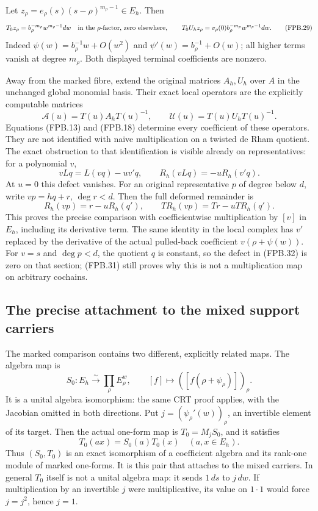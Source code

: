 Let \(z_\rho=e_\rho(s)(s-\rho)^{m_\rho-1}\in E_h\). Then
\[
 T_0z_\rho=b_\rho^{-m_\rho}w^{m_\rho-1}dw
       \quad\hbox{in the \(\rho\)-factor, zero elsewhere},
 \qquad
 T_0U_hz_\rho=v_\rho(0)b_\rho^{-m_\rho}
                       w^{m_\rho-1}dw.
 \tag{FPB.29}\label{GraphV2:eq:fpb-terminal}
\]
Indeed \(\psi(w)=b_\rho^{-1}w+O(w^2)\) and
\(\psi'(w)=b_\rho^{-1}+O(w)\); all higher terms vanish at
degree \(m_\rho\). Both displayed terminal coefficients are nonzero.

Away from the marked fibre, extend the original matrices \(A_h,U_h\)
over \(A\) in the unchanged global monomial basis. Their exact local
operators are the explicitly computable matrices
\[
 \mathcal A(u)=T(u)A_hT(u)^{-1},\qquad
 \mathcal U(u)=T(u)U_hT(u)^{-1}.
 \tag{FPB.30}\label{GraphV2:eq:fpb-transported-operators}
\]
Equations (FPB.13) and (FPB.18) determine every coefficient of these
operators. They are not identified with naive multiplication on a
twisted de Rham quotient. The exact obstruction to that identification
is visible already on representatives: for a polynomial \(v\),
\[
 vLq=L(vq)-u v'q,\qquad
 R_h(vLq)=-uR_h(v'q).
 \tag{FPB.31}\label{GraphV2:eq:fpb-Leibniz}
\]
At \(u=0\) this defect vanishes. For an original representative
\(p\) of degree below \(d\), write \(vp=hq+r\), \(\deg r<d\).
Then the full deformed remainder is
\[
 R_h(vp)=r-uR_h(q'),
 \qquad
 T R_h(vp)=T r-uT R_h(q').
 \tag{FPB.32}\label{GraphV2:eq:fpb-mult-remainder}
\]
This proves the precise comparison with coefficientwise multiplication
by \([v]\) in \(E_h\), including its derivative term. The same
identity in the local complex has \(v'\) replaced by the derivative
of the actual pulled-back coefficient \(v(\rho+\psi(w))\).
For \(v=s\) and \(\deg p<d\), the quotient \(q\) is constant,
so the defect in (FPB.32) is zero on that section; (FPB.31) still
proves why this is not a multiplication map on arbitrary cochains.

\subsection{The precise attachment to the mixed support carriers}

The marked comparison contains two different, explicitly related
maps. The algebra map is
\[
 S_0:E_h\xrightarrow{\sim}\prod_\rho E_\rho^w,
 \qquad [f]\longmapsto([f(\rho+\psi_\rho)])_\rho.
 \tag{FPB.33}\label{GraphV2:eq:fpb-ring-map}
\]
It is a unital algebra isomorphism: the same CRT proof applies, with
the Jacobian omitted in both directions. Put
\(j=(\psi_\rho'(w))_\rho\), an invertible element of its target.
Then the actual one-form map is \(T_0=M_jS_0\), and it satisfies
\[
 T_0(a x)=S_0(a)T_0(x)\quad(a,x\in E_h).
 \tag{FPB.34}\label{GraphV2:eq:fpb-semilinear}
\]
Thus \((S_0,T_0)\) is an exact isomorphism of a coefficient algebra
and its rank-one module of marked one-forms. It is this pair that
attaches to the mixed carriers. In general \(T_0\) itself is not
a unital algebra map: it sends \(1\,ds\) to \(j\,dw\). If
multiplication by an invertible \(j\) were multiplicative, its value
on \(1\cdot1\) would force \(j=j^2\), hence \(j=1\).

